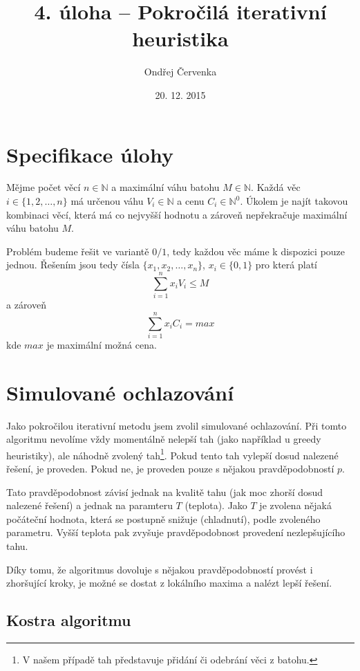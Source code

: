 \documentclass[11pt]{article}
\begin{document}
\title{4. úloha -- Pokročilá iterativní heuristika}
\author{Ondřej Červenka}
\date{20. 12. 2015}
\maketitle

\section{Specifikace úlohy}

Mějme počet věcí $n \in \mathbb{N}$ a maximální váhu batohu $M \in \mathbb{N}$. \newline Každá věc $i \in \{1, 2, \ldots, n\}$ má určenou váhu $V_i \in \mathbb{N}$ a cenu $C_i \in \mathbb{N}^0$. Úkolem je najít takovou kombinaci věcí, která má co nejvyšší hodnotu a zároveň nepřekračuje maximální váhu batohu $M$.

Problém budeme řešit ve variantě $0/1$, tedy každou věc máme k dispozici pouze jednou. Řešením jsou tedy čísla $\{x_1, x_2, \ldots, x_n\}$, $x_i \in \{0,1\}$ pro která platí $$\sum_{i=1}^n x_iV_i \leq M$$ a zároveň $$\sum_{i=1}^n x_iC_i = max $$ kde $max$ je maximální možná cena.

\section{Simulované ochlazování}

Jako pokročilou iterativní metodu jsem zvolil simulované ochlazování. Při tomto algoritmu nevolíme vždy momentálně nelepší tah (jako například u greedy heuristiky), ale náhodně zvolený tah\footnote{V našem případě tah představuje přidání či odebrání věci z batohu.}. Pokud tento tah vylepší dosud nalezené řešení, je proveden. Pokud ne, je proveden pouze s nějakou pravděpodobností $p$.

Tato pravděpodobnost závisí jednak na kvalitě tahu (jak moc zhorší dosud nalezené řešení) a jednak na paramteru $T$ (teplota). Jako $T$ je zvolena nějaká počáteční hodnota, která se postupně snižuje (chladnutí), podle zvoleného parametru. Vyšší teplota pak zvyšuje pravděpodobnost provedení nezlepšujícího tahu.

Díky tomu, že algoritmus dovoluje s nějakou pravděpodobností provést i zhoršující kroky, je možné se dostat z lokálního maxima a nalézt lepší řešení.\cite{aibook}

\subsection{Kostra algoritmu}
\label{sec:kostra}
\end{document}

